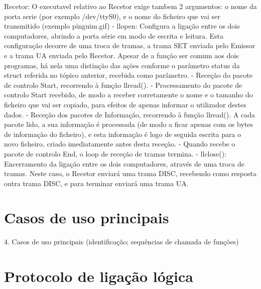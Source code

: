 \documentclass[article, a4paper, 11pt, oneside]{memoir}
\begin{document}
 Recetor:
 O executavel relativo ao Recetor exige tambem 2 argumentos: o nome da porta serie (por exemplo /dev/ttyS0), e o nome do ficheiro que vai ser transmitido (exemplo pinguim.gif)
 - llopen: Configura a ligação entre os dois computadores, abrindo a porta série em modo de escrita e leitura. Esta configuração decorre de uma troca de tramas, a trama SET enviada pelo Emissor e a trama UA enviada pelo Recetor. Apesar de a função ser comum aos dois programas, há nela uma distinção das ações conforme o parâmetro status da struct referida no tópico anterior, recebida como parâmetro.
- Receção do pacote de controlo Start, recorrendo à função llread().
- Processamento do pacote de controlo Start recebido, de modo a receber corretamente o nome e o tamanho do ficheiro que vai ser copiado, para efeitos de apenas informar o utilizador destes dados.
 - Receção dos pacotes de Informação, recorrendo à função llread(). A cada pacote lido, a sua informação é processada (de modo a ficar apenas com os bytes de informação do ficheiro), e esta informação é logo de seguida escrita para o novo ficheiro, criado imediatamente antes desta receção.
 - Quando recebe o pacote de controlo End, o loop de receção de tramas termina.
 - llclose(): Encerramento da ligação entre os dois computadores, através de uma troca de tramas. Neste caso, o Recetor enviará uma trama DISC, recebendo como resposta outra trama DISC, e para terminar enviará uma trama UA.

\newpage
\chapter[Casos de uso principais][Casos de uso principais]{Casos de uso principais} \label{\thechapter}


4. Casos de uso principais
  (identificação; sequências de chamada de funções)

\newpage
\chapter[Protocolo de ligação lógica][Protocolo de ligação lógica]{Protocolo de ligação lógica} \label{\thechapter}
\end{document}
